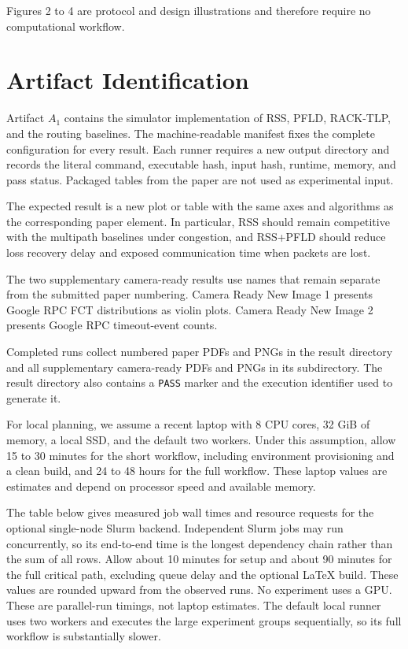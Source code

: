 \documentclass[conference]{IEEEtran}
\begin{document}
Figures 2 to 4 are protocol and design illustrations and therefore require no
computational workflow.

\section{Artifact Identification}
\newartifact
\artrel
Artifact $A_1$ contains the simulator implementation of RSS, PFLD, RACK-TLP,
and the routing baselines. The machine-readable manifest fixes the complete
configuration for every result. Each runner requires a new output directory
and records the literal command, executable hash, input hash, runtime, memory,
and pass status. Packaged tables from the paper are not used as experimental
input.

\artexp
The expected result is a new plot or table with the same axes and algorithms as
the corresponding paper element. In particular, RSS should remain competitive
with the multipath baselines under congestion, and RSS+PFLD should reduce loss
recovery delay and exposed communication time when packets are lost.

The two supplementary camera-ready results use names that remain separate from
the submitted paper numbering. Camera Ready New Image 1 presents Google RPC
FCT distributions as violin plots. Camera Ready New Image 2 presents Google
RPC timeout-event counts.

Completed runs collect numbered paper PDFs and PNGs in the result directory
and all supplementary camera-ready PDFs and PNGs in its
 subdirectory. The result directory also contains a
\texttt{PASS} marker and the execution identifier used to generate it.

\arttime
For local planning, we assume a recent laptop with 8 CPU cores, 32 GiB of
memory, a local SSD, and the default two workers. Under this assumption, allow
15 to 30 minutes for the short workflow, including environment provisioning
and a clean build, and 24 to 48 hours for the full workflow. These laptop
values are estimates and depend on processor speed and available memory.

The table below gives measured job wall times and resource requests for the
optional single-node Slurm backend. Independent Slurm jobs may run concurrently,
so its end-to-end time is the longest dependency chain rather than the sum of
all rows. Allow about 10 minutes for setup and about 90 minutes for the full
critical path, excluding queue delay and the optional LaTeX build. These values
are rounded upward from the observed runs. No experiment uses a GPU.
These are parallel-run timings, not laptop estimates. The default local runner
uses two workers and executes the large experiment groups sequentially, so its
full workflow is substantially slower.
\end{document}
